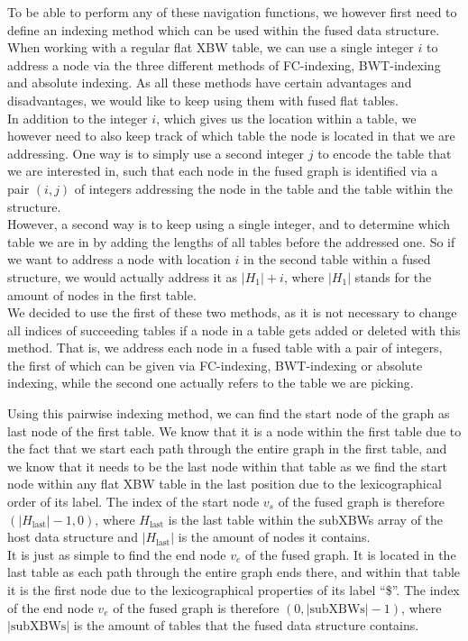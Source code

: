 \documentclass[a4paper,12pt,twoside,BCOR=10mm]{scrbook}
\begin{document}
To be able to perform any of these navigation functions, we however first need to
define an indexing method which can be used within the fused data structure.
When working with a regular flat XBW table, we can use a single integer $ i $ to
address a node via the three different methods of FC-indexing, BWT-indexing and absolute indexing.
As all these methods have certain advantages and disadvantages, we would like to
keep using them with fused flat tables. \\
In addition to the integer $ i $, which gives us the location within a table,
we however need to also keep track of which table the node is located in that we are addressing.
One way is to simply use a second integer $ j $ to encode the table that we are interested in,
such that each node in the fused graph is identified via a pair $ (i, j) $ of integers addressing the
node in the table and the table within the structure. \\
However, a second way is to keep using a single integer, and to determine which table we are in
by adding the lengths of all tables before the addressed one. So if we want to address a node
with location $ i $ in the second table within a fused structure, we would actually address it as $ | H_1 | + i $,
where $ | H_1 | $ stands for the amount of nodes in the first table. \\
We decided to use the first of these two methods, as it is not necessary to change all indices
of succeeding tables if a node in a table gets added or deleted with this method.
That is, we address each node in a fused table with a pair of integers, the first of which
can be given via FC-indexing, BWT-indexing or absolute indexing, while the second one
actually refers to the table we are picking.

Using this pairwise indexing method, we can find the start node of the graph as
last node of the first table.
We know that it is a node within the first table due to the fact that we start each path
through the entire graph
in the first table, and we know that it needs to be the last node within that table
as we find the start node within any flat XBW table in the last position due to
the lexicographical order of its label.
The index of the start node $ v_s $ of the fused graph
is therefore $ ( | H_{\textrm{last}} | - 1, 0 ) $,
where $ H_{\textrm{last}} $ is the last table within the subXBWs array of the host data structure and
$ | H_{\textrm{last}} | $ is the amount of nodes it contains. \\
It is just as simple to find the end node $ v_e $ of the fused graph.
It is located in the last table as each path through the entire graph ends there,
and within that table it is the first node due to the lexicographical properties of
its label “\$”.
The index of the end node $ v_e $ of the fused graph
is therefore $ ( 0, | \textrm{subXBWs} | - 1 ) $,
where $ | \textrm{subXBWs} | $ is the amount of tables
that the fused data structure contains.
\end{document}
